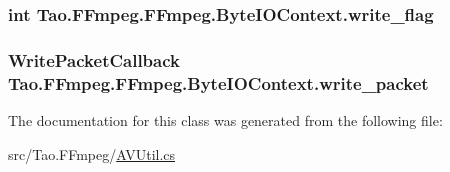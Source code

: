 \label{class_tao_1_1_f_fmpeg_1_1_f_fmpeg_1_1_byte_i_o_context_a82a818f0432ea41a85b7e990fc2a91fb}
\hypertarget{class_tao_1_1_f_fmpeg_1_1_f_fmpeg_1_1_byte_i_o_context_a36b5aeaaec0b33b20e62fe68c149a310}{
\subsubsection[{write\_\-flag}]{\setlength{\rightskip}{0pt plus 5cm}int {\bf Tao.FFmpeg.FFmpeg.ByteIOContext.write\_\-flag}}}
\label{class_tao_1_1_f_fmpeg_1_1_f_fmpeg_1_1_byte_i_o_context_a36b5aeaaec0b33b20e62fe68c149a310}
\hypertarget{class_tao_1_1_f_fmpeg_1_1_f_fmpeg_1_1_byte_i_o_context_a5d96beca7cf0b2da657f00a636ae8877}{
\subsubsection[{write\_\-packet}]{\setlength{\rightskip}{0pt plus 5cm}WritePacketCallback {\bf Tao.FFmpeg.FFmpeg.ByteIOContext.write\_\-packet}}}
\label{class_tao_1_1_f_fmpeg_1_1_f_fmpeg_1_1_byte_i_o_context_a5d96beca7cf0b2da657f00a636ae8877}


The documentation for this class was generated from the following file:\begin{DoxyCompactItemize}
\item 
src/Tao.FFmpeg/\hyperlink{_a_v_util_8cs}{AVUtil.cs}\end{DoxyCompactItemize}
